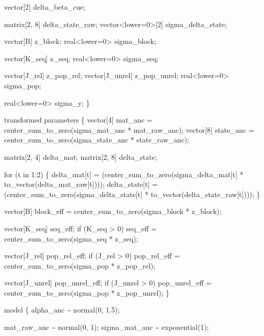 \documentclass[
]{article}
\newenvironment{Shaded}{\begin{snugshade}}{\end{snugshade}}
\newcommand{\StringTok}[1]{\textcolor[rgb]{0.31,0.60,0.02}{#1}}
\begin{document}
\begin{Shaded}
\begin{Highlighting}[]
\StringTok{  vector[2] delta\_beta\_cue;}

\StringTok{  matrix[2, 8] delta\_state\_raw;}
\StringTok{  vector\textless{}lower=0\textgreater{}[2] sigma\_delta\_state;}

\StringTok{  vector[B] z\_block;}
\StringTok{  real\textless{}lower=0\textgreater{} sigma\_block;}

\StringTok{  vector[K\_seq] z\_seq;}
\StringTok{  real\textless{}lower=0\textgreater{} sigma\_seq;}

\StringTok{  vector[J\_rel] z\_pop\_rel;}
\StringTok{  vector[J\_unrel] z\_pop\_unrel;}
\StringTok{  real\textless{}lower=0\textgreater{} sigma\_pop;}

\StringTok{  real\textless{}lower=0\textgreater{} sigma\_y;}
\StringTok{\}}

\StringTok{transformed parameters \{}
\StringTok{  vector[4] mat\_anc   = center\_sum\_to\_zero(sigma\_mat\_anc * mat\_raw\_anc);}
\StringTok{  vector[8] state\_anc = center\_sum\_to\_zero(sigma\_state\_anc * state\_raw\_anc);}

\StringTok{  matrix[2, 4] delta\_mat;}
\StringTok{  matrix[2, 8] delta\_state;}

\StringTok{  for (t in 1:2) \{}
\StringTok{    delta\_mat[t] = (center\_sum\_to\_zero(sigma\_delta\_mat[t] * to\_vector(delta\_mat\_raw[t])))\textquotesingle{};}
\StringTok{    delta\_state[t] = (center\_sum\_to\_zero(sigma\_delta\_state[t] * to\_vector(delta\_state\_raw[t])))\textquotesingle{};}
\StringTok{  \}}

\StringTok{  vector[B] block\_eff = center\_sum\_to\_zero(sigma\_block * z\_block);}

\StringTok{  vector[K\_seq] seq\_eff;}
\StringTok{  if (K\_seq \textgreater{} 0)}
\StringTok{    seq\_eff = center\_sum\_to\_zero(sigma\_seq * z\_seq);}

\StringTok{  vector[J\_rel] pop\_rel\_eff;}
\StringTok{  if (J\_rel \textgreater{} 0)}
\StringTok{    pop\_rel\_eff = center\_sum\_to\_zero(sigma\_pop * z\_pop\_rel);}

\StringTok{  vector[J\_unrel] pop\_unrel\_eff;}
\StringTok{  if (J\_unrel \textgreater{} 0)}
\StringTok{    pop\_unrel\_eff = center\_sum\_to\_zero(sigma\_pop * z\_pop\_unrel);}
\StringTok{\}}

\StringTok{model \{}
\StringTok{  alpha\_anc \textasciitilde{} normal(0, 1.5);}

\StringTok{  mat\_raw\_anc \textasciitilde{} normal(0, 1);}
\StringTok{  sigma\_mat\_anc \textasciitilde{} exponential(1);}


\end{Highlighting}
\end{Shaded}
\end{document}

